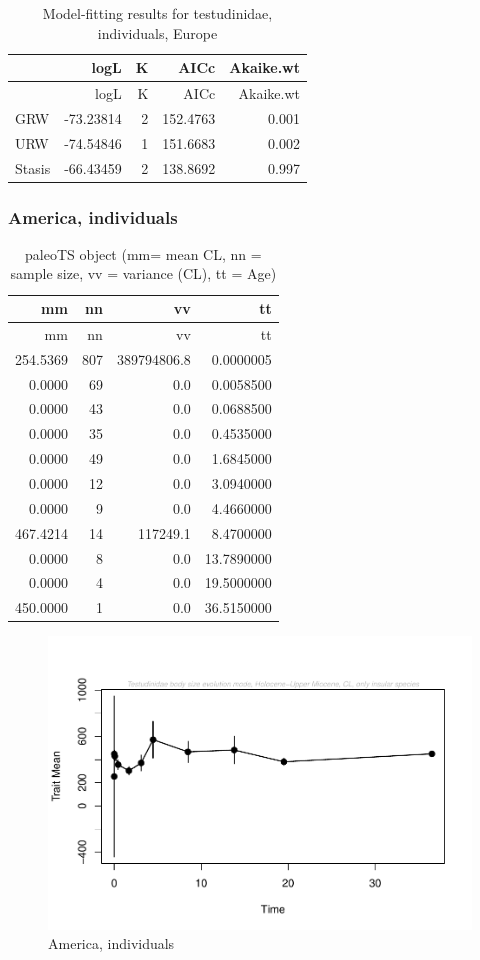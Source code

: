 \documentclass[]{article}
\begin{document}
\begin{longtable}[]{@{}lrrrr@{}}
\caption{Model-fitting results for testudinidae, individuals,
Europe}\tabularnewline
\toprule
& logL & K & AICc & Akaike.wt\tabularnewline
\midrule
\endfirsthead
\toprule
& logL & K & AICc & Akaike.wt\tabularnewline
\midrule
\endhead
GRW & -73.23814 & 2 & 152.4763 & 0.001\tabularnewline
URW & -74.54846 & 1 & 151.6683 & 0.002\tabularnewline
Stasis & -66.43459 & 2 & 138.8692 & 0.997\tabularnewline
\bottomrule
\end{longtable}

\newpage

\subsubsection{America, individuals}\label{america-individuals}

\begin{longtable}[]{@{}rrrr@{}}
\caption{paleoTS object (mm= mean CL, nn = sample size, vv = variance
(CL), tt = Age)}\tabularnewline
\toprule
mm & nn & vv & tt\tabularnewline
\midrule
\endfirsthead
\toprule
mm & nn & vv & tt\tabularnewline
\midrule
\endhead
254.5369 & 807 & 389794806.8 & 0.0000005\tabularnewline
0.0000 & 69 & 0.0 & 0.0058500\tabularnewline
0.0000 & 43 & 0.0 & 0.0688500\tabularnewline
0.0000 & 35 & 0.0 & 0.4535000\tabularnewline
0.0000 & 49 & 0.0 & 1.6845000\tabularnewline
0.0000 & 12 & 0.0 & 3.0940000\tabularnewline
0.0000 & 9 & 0.0 & 4.4660000\tabularnewline
467.4214 & 14 & 117249.1 & 8.4700000\tabularnewline
0.0000 & 8 & 0.0 & 13.7890000\tabularnewline
0.0000 & 4 & 0.0 & 19.5000000\tabularnewline
450.0000 & 1 & 0.0 & 36.5150000\tabularnewline
\bottomrule
\end{longtable}

\begin{figure}[htbp]
\centering
\includegraphics{MA_JJ_files/figure-latex/paleoTS, individuals, America-1.pdf}
\caption{America, individuals}
\end{figure}
\end{document}
